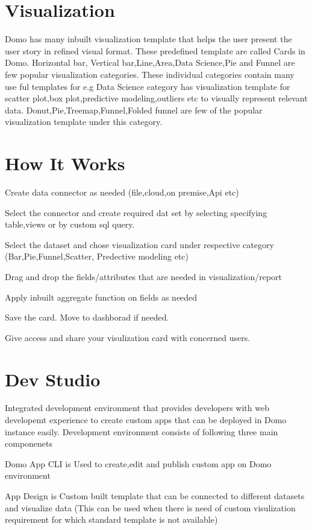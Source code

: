 \section{Visualization}

Domo has many inbuilt visualization template that helps the 
user present the user story in refined visual format.
These predefined template are called Cards in Domo. Horizontal bar,
Vertical bar,Line,Area,Data Science,Pie and Funnel are 
few popular visualization categories. These individual categories 
contain many use ful templates for e.g Data Science category 
has visualization template for scatter plot,box plot,predictive 
modeling,outliers etc to visually represent relevant data. 
Donut,Pie,Treemap,Funnel,Folded funnel are few of the
popular visualization template under this category.



\section{How It Works}
Create data connector as needed (file,cloud,on premise,Api etc)

Select the connector and create required dat set by 
selecting specifying table,views or by custom sql query.

Select the dataset and chose visualization card under 
respective category (Bar,Pie,Funnel,Scatter,
Predective modeling etc)

Drag and drop the fields/attributes that are needed 
in visualization/report 

Apply inbuilt aggregate function on fields as needed 

Save the card. Move to dashborad if needed.

Give access and share your visulization card with concerned users.


\section{Dev Studio}

Integrated development environment that provides developers 
with web developemt experience to create custom apps that 
can be deployed in Domo instance easily. Development environment 
consists of following three main componenets

Domo App CLI is Used to create,edit and publish custom app 
on Domo environment

App Design is Custom built template that can be connected to 
different datasets and visualize data (This can be used when 
there is need of custom visulization requirement for which 
standard template is not available)

